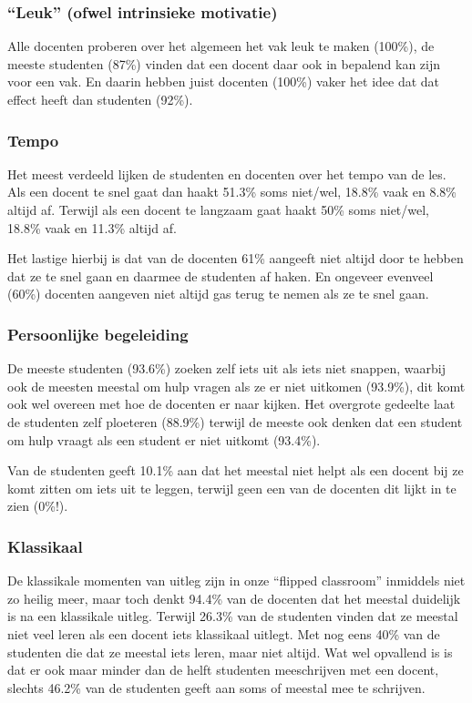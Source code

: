 \subsubsection{``Leuk'' (ofwel intrinsieke motivatie)}
Alle docenten proberen over het algemeen het vak leuk te maken (100\%), de meeste studenten (87\%) vinden dat een docent daar ook in bepalend kan zijn voor een vak. En daarin hebben juist docenten (100\%) vaker het idee dat dat effect heeft dan studenten (92\%).

\subsubsection{Tempo}
Het meest verdeeld lijken de studenten en docenten over het tempo van de les. Als een docent te snel gaat dan haakt 51.3\% soms niet/wel, 18.8\% vaak en 8.8\% altijd af. Terwijl als een docent te langzaam gaat haakt 50\% soms niet/wel, 18.8\% vaak en 11.3\% altijd af.

Het lastige hierbij is dat van de docenten 61\% aangeeft niet altijd door te hebben dat ze te snel gaan en daarmee de studenten af haken. En ongeveer evenveel (60\%) docenten aangeven niet altijd gas terug te nemen als ze te snel gaan.

\subsubsection{Persoonlijke begeleiding}
De meeste studenten (93.6\%) zoeken zelf iets uit als iets niet snappen, waarbij ook de meesten meestal om hulp vragen als ze er niet uitkomen (93.9\%), dit komt ook wel overeen met hoe de docenten er naar kijken. Het overgrote gedeelte laat de studenten zelf ploeteren (88.9\%) terwijl de meeste ook denken dat een student om hulp vraagt als een student er niet uitkomt (93.4\%).

Van de studenten geeft 10.1\% aan dat het meestal niet helpt als een docent bij ze komt zitten om iets uit te leggen, terwijl geen een van de docenten dit lijkt in te zien (0\%!).

\subsubsection{Klassikaal}
De klassikale momenten van uitleg zijn in onze ``flipped classroom'' inmiddels niet zo heilig meer, maar toch denkt 94.4\% van de docenten dat het meestal duidelijk is na een klassikale uitleg. Terwijl 26.3\% van de studenten vinden dat ze meestal niet veel leren als een docent iets klassikaal uitlegt. Met nog eens 40\% van de studenten die dat ze meestal iets leren, maar niet altijd.
Wat wel opvallend is is dat er ook maar minder dan de helft studenten meeschrijven met een docent, slechts 46.2\% van de studenten geeft aan soms of meestal mee te schrijven.

